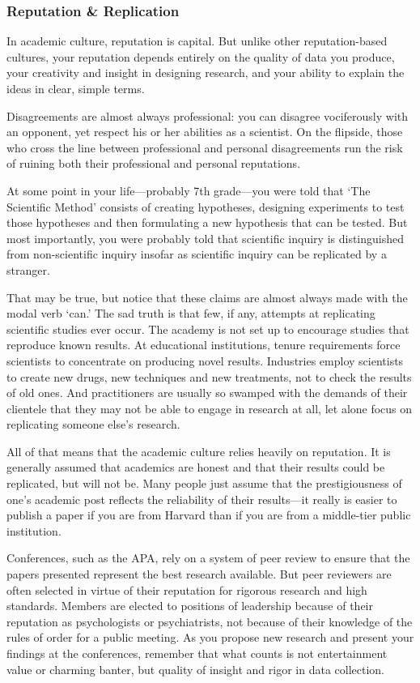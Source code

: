 \begin{refsection}
\subsubsection{Reputation \& Replication}
\label{reputationreplication}

In academic culture, reputation is capital. But unlike other reputation-based cultures, your reputation depends entirely on the quality of data you produce, your creativity and insight in designing research, and your ability to explain the ideas in clear, simple terms. 

Disagreements are almost always professional: you can disagree vociferously with an opponent, yet respect his or her abilities as a scientist. On the flipside, those who cross the line between professional and personal disagreements run the risk of ruining both their professional and personal reputations.

At some point in your life---probably 7th grade---you were told that `The Scientific Method' consists of creating hypotheses, designing experiments to test those hypotheses and then formulating a new hypothesis that can be tested. But most importantly, you were probably told that scientific inquiry is distinguished from non-scientific inquiry insofar as scientific inquiry can be replicated by a stranger. 

That may be true, but notice that these claims are almost always made with the modal verb `can.' The sad truth is that few, if any, attempts at replicating scientific studies ever occur. The academy is not set up to encourage studies that reproduce known results. At educational institutions, tenure requirements force scientists to concentrate on producing novel results. Industries employ scientists to create new drugs, new techniques and new treatments, not to check the results of old ones. And practitioners are usually so swamped with the demands of their clientele that they may not be able to engage in research at all, let alone focus on replicating someone else's research.

All of that means that the academic culture relies heavily on reputation. It is generally assumed that academics are honest and that their results could be replicated, but will not be. Many people just assume that the prestigiousness of one's academic post reflects the reliability of their results---it really is easier to publish a paper if you are from Harvard than if you are from a middle-tier public institution.

Conferences, such as the APA, rely on a system of peer review to ensure that the papers presented represent the best research available. But peer reviewers are often selected in virtue of their reputation for rigorous research and high standards. Members are elected to positions of leadership because of their reputation as psychologists or psychiatrists, not because of their knowledge of the rules of order for a public meeting. As you propose new research and present your findings at the conferences, remember that what counts is not entertainment value or charming banter, but quality of insight and rigor in data collection.


\end{refsection}
